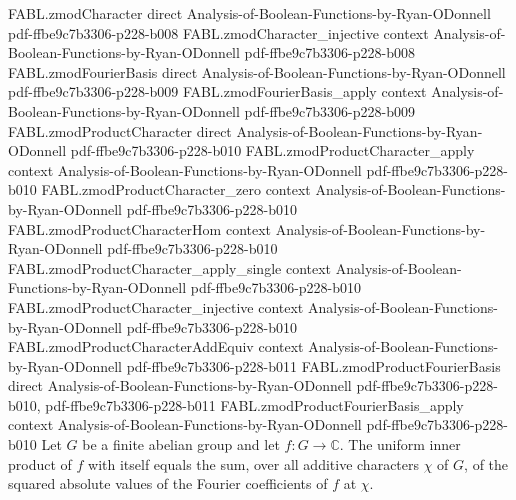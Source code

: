 \begin{theorem}
\proofstep
  {FABL.zmodCharacter}
  {direct}
  {Analysis-of-Boolean-Functions-by-Ryan-ODonnell}
  {pdf-ffbe9c7b3306-p228-b008}
\proofstep
  {FABL.zmodCharacter_injective}
  {context}
  {Analysis-of-Boolean-Functions-by-Ryan-ODonnell}
  {pdf-ffbe9c7b3306-p228-b008}
\proofstep
  {FABL.zmodFourierBasis}
  {direct}
  {Analysis-of-Boolean-Functions-by-Ryan-ODonnell}
  {pdf-ffbe9c7b3306-p228-b009}
\proofstep
  {FABL.zmodFourierBasis_apply}
  {context}
  {Analysis-of-Boolean-Functions-by-Ryan-ODonnell}
  {pdf-ffbe9c7b3306-p228-b009}
\proofstep
  {FABL.zmodProductCharacter}
  {direct}
  {Analysis-of-Boolean-Functions-by-Ryan-ODonnell}
  {pdf-ffbe9c7b3306-p228-b010}
\proofstep
  {FABL.zmodProductCharacter_apply}
  {context}
  {Analysis-of-Boolean-Functions-by-Ryan-ODonnell}
  {pdf-ffbe9c7b3306-p228-b010}
\proofstep
  {FABL.zmodProductCharacter_zero}
  {context}
  {Analysis-of-Boolean-Functions-by-Ryan-ODonnell}
  {pdf-ffbe9c7b3306-p228-b010}
\proofstep
  {FABL.zmodProductCharacterHom}
  {context}
  {Analysis-of-Boolean-Functions-by-Ryan-ODonnell}
  {pdf-ffbe9c7b3306-p228-b010}
\proofstep
  {FABL.zmodProductCharacter_apply_single}
  {context}
  {Analysis-of-Boolean-Functions-by-Ryan-ODonnell}
  {pdf-ffbe9c7b3306-p228-b010}
\proofstep
  {FABL.zmodProductCharacter_injective}
  {context}
  {Analysis-of-Boolean-Functions-by-Ryan-ODonnell}
  {pdf-ffbe9c7b3306-p228-b010}
\proofstep
  {FABL.zmodProductCharacterAddEquiv}
  {context}
  {Analysis-of-Boolean-Functions-by-Ryan-ODonnell}
  {pdf-ffbe9c7b3306-p228-b011}
\proofstep
  {FABL.zmodProductFourierBasis}
  {direct}
  {Analysis-of-Boolean-Functions-by-Ryan-ODonnell}
  {pdf-ffbe9c7b3306-p228-b010,
    pdf-ffbe9c7b3306-p228-b011}
\proofstep
  {FABL.zmodProductFourierBasis_apply}
  {context}
  {Analysis-of-Boolean-Functions-by-Ryan-ODonnell}
  {pdf-ffbe9c7b3306-p228-b010}
Let $G$ be a finite abelian group and let $f:G\to\mathbb{C}$. The uniform inner product
of $f$ with itself equals the sum, over all additive characters $\chi$ of $G$, of the
squared absolute values of the Fourier coefficients of $f$ at $\chi$.
\end{theorem}

